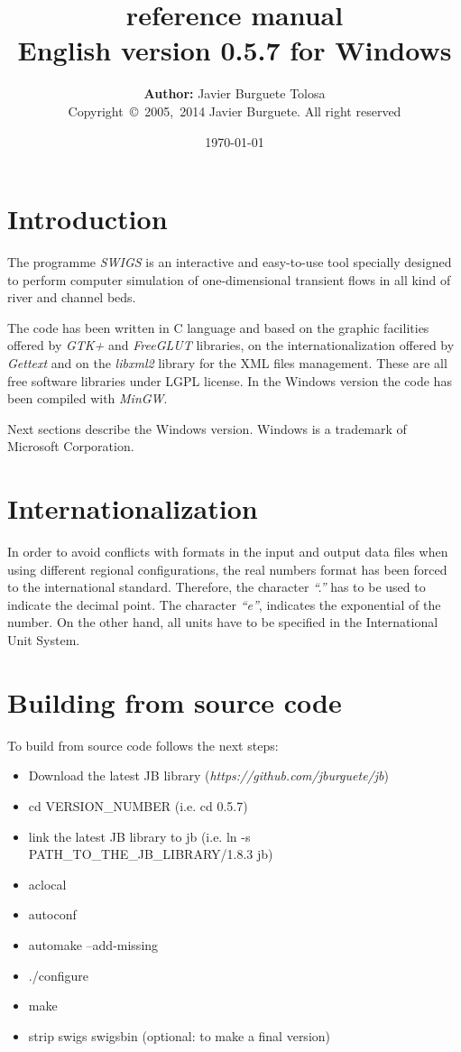 \documentclass[a4paper,12pt]{article}
\title
{
	{\bf\Large {\swigs} reference manual}\\
	{\large	English version 0.5.7 for Windows}
}
\author
{
	{\bf Author:} Javier Burguete Tolosa\\
	{\small Copyright~\copyright~2005,~2014 Javier Burguete.
	All right reserved}
}
\date{\today}
\newcommand{\swigs}{\emph{SWIGS}}
\newcommand{\IT}[1]{{\sl ``#1''}}
\begin{document}
\maketitle

\tableofcontents
\clearpage

\setlength{\parskip}{\baselineskip / 2}

\section{Introduction}

The programme {\swigs} is an interactive and easy-to-use tool specially designed
to perform computer simulation of one-dimensional transient flows in all kind of
river and channel beds. 

The code has been written in C language and based on the graphic facilities
offered by \emph{GTK+} and \emph{FreeGLUT} libraries, on the
internationalization offered by \emph{Gettext} and on the \emph{libxml2} library
for the XML files management. These are all free software libraries under LGPL
license. In the Windows version the code has been compiled with \emph{MinGW}.

Next sections describe the Windows version. Windows is a trademark of Microsoft
Corporation.

\section{Internationalization}

In order to avoid conflicts with formats in the input and output data files when
using different regional configurations, the real numbers format has been forced
to the international standard. Therefore, the character \IT{.} has to be used to
indicate the decimal point. The character \IT{e}, indicates the exponential of
the number. On the other hand, all units have to be specified in the
International Unit System. 

\section{Building from source code}

To build from source code follows the next steps:
\begin{itemize}
	\item Download the latest JB library
		(\emph{https://github.com/jburguete/jb})
	\item cd VERSION\_NUMBER (i.e. cd 0.5.7)
	\item link the latest JB library to jb (i.e. ln -s
		PATH\_TO\_THE\_JB\_LIBRARY/1.8.3 jb)
	\item aclocal
	\item autoconf
	\item automake --add-missing
	\item ./configure
	\item make
	\item strip swigs swigsbin (optional: to make a final version)
\end{itemize}
\end{document}
